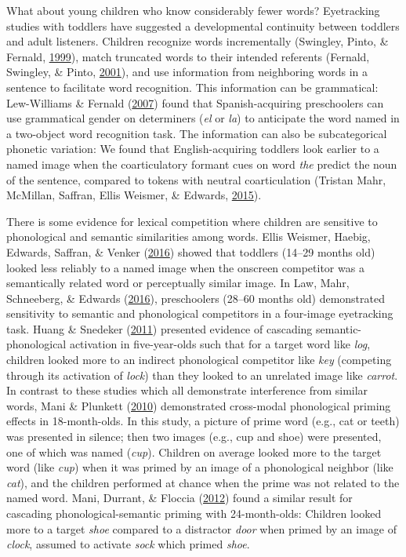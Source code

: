 \documentclass [11pt, proquest] {uwthesis}[2015/03/03]
\begin{document}
What about young children who know considerably fewer words? Eyetracking
studies with toddlers have suggested a developmental continuity between
toddlers and adult listeners. Children recognize words incrementally
(Swingley, Pinto, \& Fernald,
\protect\hyperlink{ref-Swingley1999}{1999}), match truncated words to
their intended referents (Fernald, Swingley, \& Pinto,
\protect\hyperlink{ref-Fernald2001}{2001}), and use information from
neighboring words in a sentence to facilitate word recognition. This
information can be grammatical: Lew-Williams \& Fernald
(\protect\hyperlink{ref-Lew-Williams2007}{2007}) found that
Spanish-acquiring preschoolers can use grammatical gender on determiners
(\emph{el} or \emph{la}) to anticipate the word named in a two-object
word recognition task. The information can also be subcategorical
phonetic variation: We found that English-acquiring toddlers look
earlier to a named image when the coarticulatory formant cues on word
\emph{the} predict the noun of the sentence, compared to tokens with
neutral coarticulation (Tristan Mahr, McMillan, Saffran, Ellis Weismer,
\& Edwards, \protect\hyperlink{ref-Mahr2015}{2015}).

There is some evidence for lexical competition where children are
sensitive to phonological and semantic similarities among words. Ellis
Weismer, Haebig, Edwards, Saffran, \& Venker
(\protect\hyperlink{ref-EllisWeismer2016}{2016}) showed that toddlers
(14--29 months old) looked less reliably to a named image when the
onscreen competitor was a semantically related word or perceptually
similar image. In Law, Mahr, Schneeberg, \& Edwards
(\protect\hyperlink{ref-RWLPaper}{2016}), preschoolers (28--60 months
old) demonstrated sensitivity to semantic and phonological competitors
in a four-image eyetracking task. Huang \& Snedeker
(\protect\hyperlink{ref-Huang2011}{2011}) presented evidence of
cascading semantic-phonological activation in five-year-olds such that
for a target word like \emph{log}, children looked more to an indirect
phonological competitor like \emph{key} (competing through its
activation of \emph{lock}) than they looked to an unrelated image like
\emph{carrot}. In contrast to these studies which all demonstrate
interference from similar words, Mani \& Plunkett
(\protect\hyperlink{ref-Mani2010}{2010}) demonstrated cross-modal
phonological priming effects in 18-month-olds. In this study, a picture
of prime word (e.g., cat or teeth) was presented in silence; then two
images (e.g., cup and shoe) were presented, one of which was named
(\emph{cup}). Children on average looked more to the target word (like
\emph{cup}) when it was primed by an image of a phonological neighbor
(like \emph{cat}), and the children performed at chance when the prime
was not related to the named word. Mani, Durrant, \& Floccia
(\protect\hyperlink{ref-Mani2012}{2012}) found a similar result for
cascading phonological-semantic priming with 24-month-olds: Children
looked more to a target \emph{shoe} compared to a distractor \emph{door}
when primed by an image of \emph{clock}, assumed to activate \emph{sock}
which primed \emph{shoe}.
\end{document}
